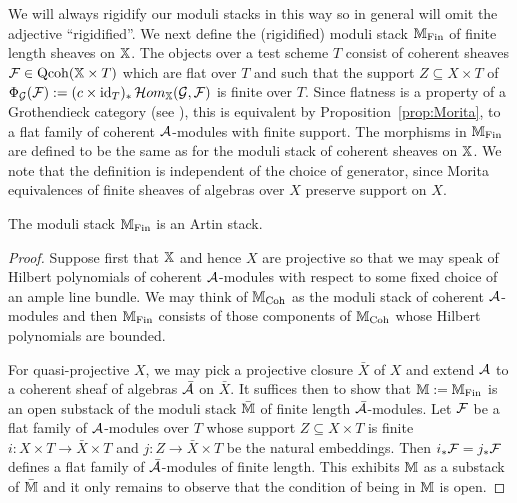 \documentclass[12pt]{amsart}
\begin{document}
We will always rigidify our moduli stacks in this way so in general will omit the adjective ``rigidified''. We next define the (rigidified) moduli stack $\mathbb{M}_{\textup{Fin}}$ of finite length sheaves on $\mathbb{X}$. The objects over a test scheme $T$ consist of coherent sheaves $\mathcal{F} \in \operatorname{Qcoh}(\mathbb{X} \times T)$ which are flat over $T$ and such that the support $Z \subseteq X \times T$ of $\Phi_{\mathcal{G}}(\mathcal{F}):=(c\times \operatorname{id}_T)_*\mathop{{\mathcal{H}}om}\nolimits_{\mathbb{X}}(\mathcal{G}, \mathcal{F})$ is finite over $T$. Since flatness is a property of a Grothendieck category (see \cite{AZ01}), this is equivalent by Proposition~\ref{prop:Morita}, to a flat family of coherent $\mathcal{A}$-modules with finite support. The morphisms in $\mathbb{M}_{\textup{Fin}}$ are defined to be the same as for the moduli stack of coherent sheaves on $\mathbb{X}$. We note that the definition is independent of the choice of generator, since Morita equivalences of finite sheaves of algebras over $X$ preserve support on $X$.

\begin{proposition}  \label{prop:MFinisartin}
The moduli stack $\mathbb{M}_\textup{Fin}$ is an Artin stack.
\end{proposition}
\begin{proof}
Suppose first that $\mathbb{X}$ and hence $X$ are projective so that we may speak of Hilbert polynomials of coherent $\mathcal{A}$-modules with respect to some fixed choice of an ample line bundle. We may think of $\mathbb{M}_{\operatorname{Coh}}$ as the moduli stack of coherent $\mathcal{A}$-modules and then $\mathbb{M}_{\textup{Fin}}$ consists of those components of $\mathbb{M}_{\operatorname{Coh}}$ whose Hilbert polynomials are bounded. 

For quasi-projective $X$, we may pick a projective closure $\bar{X}$ of $X$ and extend $\mathcal{A}$ to a coherent sheaf of algebras $\bar{\mathcal{A}}$ on $\bar{X}$. It suffices then to show that $\mathbb{M} := \mathbb{M}_{\textup{Fin}}$ is an open substack of the moduli stack $\bar{\mathbb{M}}$ of finite length $\bar{\mathcal{A}}$-modules. 
Let $\mathcal{F}$ be a flat family of $\mathcal{A}$-modules over $T$ whose support $Z \subseteq X \times T$ is finite $i\colon X \times T \to \bar{X} \times T$ and $j \colon Z \to \bar{X} \times T$ be the natural embeddings. Then $i_* \mathcal{F} = j_* \mathcal{F}$ defines a flat family of $\bar{\mathcal{A}}$-modules of finite length. This exhibits $\mathbb{M}$ as a substack of $\bar{\mathbb{M}}$ and it only remains to observe that the condition of being in $\mathbb{M}$ is open. 
\end{proof}
\end{document}
